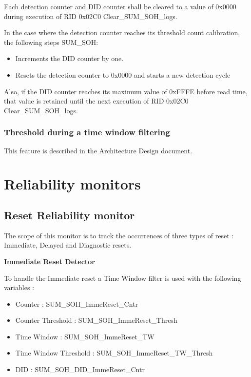 {Each detection counter and DID counter shall be cleared to a value of 0x0000 during execution of RID 0x02C0 Clear_SUM_SOH_logs.}
{
}

{
In the case where the detection counter reaches its threshold count calibration, the following steps SUM\_SOH:
\begin{itemize}
	\item Increments the DID counter by one.
	\item Resets the detection counter to 0x0000 and starts a new detection cycle
\end{itemize}

Also, if the DID counter reaches its maximum value of 0xFFFE before read time, that value is retained until the next execution of RID 0x02C0 Clear\_SUM\_SOH\_logs.
}
{
  
}


\subsubsection{Threshold during a time window filtering}
This feature is described in the Architecture Design document.


\section{Reliability monitors}
\subsection{Reset Reliability monitor}

{
The scope of this monitor is to track the occurrences of three types of reset : Immediate, Delayed and Diagnostic resets.
}
{
     
}

{
    \textbf{Immediate Reset Detector}
    
    
    To handle the Immediate reset a Time Window filter is used  with the following variables :
    
    \begin{itemize}
        \item Counter               : SUM_SOH_ImmeReset_Cntr
        \item Counter Threshold     : SUM_SOH_ImmeReset_Thresh
        \item Time Window           : SUM_SOH_ImmeReset_TW
        \item Time Window Threshold : SUM_SOH_ImmeReset_TW_Thresh
        \item DID                   : SUM_SOH_DID_ImmeReset_Cntr
    \end{itemize}
    
}
{
       
}

